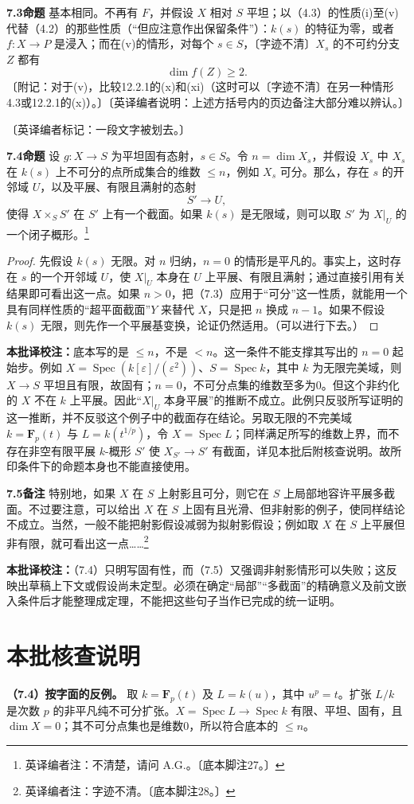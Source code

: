 \documentclass{ctexbook}
\newcommand{\Spec}{\operatorname{Spec}}
\newcommand{\ednote}[1]{\footnote{英译编者注：#1}}
\newcommand{\tnote}[1]{\par\smallskip\noindent\textbf{本批译校注：}#1\par\smallskip}
\newcommand{\entry}[2]{\par\bigskip\noindent\textbf{#1\quad #2}\quad}
\begin{document}
\entry{7.3}{命题}
基本相同。不再有 $F$，并假设 $X$ 相对 $S$ 平坦；以（4.3）的性质(i)至(v)代替（4.2）的那些性质（“但应注意作出保留条件”）：$k(s)$ 的特征为零，或者 $f:X\to P$ 是浸入；而在(v)的情形，对每个 $s\in S$，〔字迹不清〕$X_s$ 的不可约分支 $Z$ 都有
\[
 \dim f(Z)\geq2.
\]
〔附记：对于(v)，比较12.2.1的(x)和(xi)（这时可以〔字迹不清〕在另一种情形4.3或12.2.1的(x)）。〕〔英译编者说明：上述方括号内的页边备注大部分难以辨认。〕

〔英译编者标记：一段文字被划去。〕

\entry{7.4}{命题}
设 $g:X\to S$ 为平坦固有态射，$s\in S$。令 $n=\dim X_s$，并假设 $X_s$ 中 $X_s$ 在 $k(s)$ 上不可分的点所成集合的维数 $\leq n$，例如 $X_s$ 可分。那么，存在 $s$ 的开邻域 $U$，以及平展、有限且满射的态射
\[
 S'\longrightarrow U,
\]
使得 $X\times_S S'$ 在 $S'$ 上有一个截面。如果 $k(s)$ 是无限域，则可以取 $S'$ 为 $X|_U$ 的一个闭子概形。\ednote{不清楚，请问 A.G.。〔底本脚注27。〕}
\begin{proof}
先假设 $k(s)$ 无限。对 $n$ 归纳，$n=0$ 的情形是平凡的。事实上，这时存在 $s$ 的一个开邻域 $U$，使 $X|_U$ 本身在 $U$ 上平展、有限且满射；通过直接引用有关结果即可看出这一点。如果 $n>0$，把（7.3）应用于“可分”这一性质，就能用一个具有同样性质的“超平面截面”$Y$ 来替代 $X$，只是把 $n$ 换成 $n-1$。如果不假设 $k(s)$ 无限，则先作一个平展基变换，论证仍然适用。（可以进行下去。）
\end{proof}
\tnote{底本写的是 $\leq n$，不是 $<n$。这一条件不能支撑其写出的 $n=0$ 起始步。例如 $X=\Spec(k[\varepsilon]/(\varepsilon^2))$、$S=\Spec k$，其中 $k$ 为无限完美域，则 $X\to S$ 平坦且有限，故固有；$n=0$，不可分点集的维数至多为0。但这个非约化的 $X$ 不在 $k$ 上平展。因此“$X|_U$ 本身平展”的推断不成立。此例只反驳所写证明的这一推断，并不反驳这个例子中的截面存在结论。另取无限的不完美域 $k=\mathbf F_p(t)$ 与 $L=k(t^{1/p})$，令 $X=\Spec L$；同样满足所写的维数上界，而不存在非空有限平展 $k$-概形 $S'$ 使 $X_{S'}\to S'$ 有截面，详见本批后附核查说明。故所印条件下的命题本身也不能直接使用。}

\entry{7.5}{备注}
特别地，如果 $X$ 在 $S$ 上射影且可分，则它在 $S$ 上局部地容许平展多截面。不过要注意，可以给出 $X$ 在 $S$ 上固有且光滑、但非射影的例子，使同样结论不成立。当然，一般不能把射影假设减弱为拟射影假设；例如取 $X$ 在 $S$ 上平展但非有限，就可看出这一点……\ednote{字迹不清。〔底本脚注28。〕}
\tnote{（7.4）只明写固有性，而（7.5）又强调非射影情形可以失败；这反映出草稿上下文或假设尚未定型。必须在确定“局部”“多截面”的精确意义及前文嵌入条件后才能整理成定理，不能把这些句子当作已完成的统一证明。}

\backmatter
\chapter*{本批核查说明}
\noindent\textbf{（7.4）按字面的反例。}
取 $k=\mathbf F_p(t)$ 及 $L=k(u)$，其中 $u^p=t$。扩张 $L/k$ 是次数 $p$ 的非平凡纯不可分扩张。$X=\Spec L\to\Spec k$ 有限、平坦、固有，且 $\dim X=0$；其不可分点集也是维数0，所以符合底本的 $\leq n$。
\end{document}
